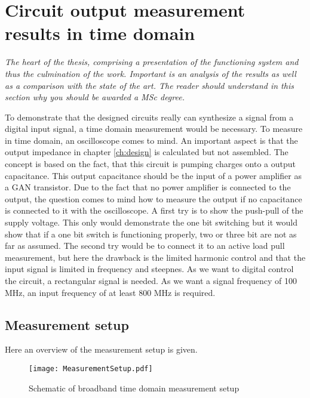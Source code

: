 \chapter{Circuit output measurement results in time domain}
\textit{The heart of the thesis, comprising a presentation of the functioning system and thus the culmination of the work. Important is an analysis of the results as well as a comparison with the state of the art. The reader should understand in this section why you should be awarded a MSc degree.}

To demonstrate that the designed circuits really can synthesize a signal from a digital input signal, a time domain measurement would be necessary.
To measure in time domain, an oscilloscope comes to mind.
An important aspect is that the output impedance in chapter \ref{ch:design} is calculated but not assembled. 
The concept is based on the fact, that this circuit is pumping charges onto a output capacitance.
This output capacitance should be the input of a power amplifier as a GAN transistor.
Due to the fact that no power amplifier is connected to the output, the question comes to mind how to measure the output if no capacitance is connected to it with the oscilloscope.
A first try is to show the push-pull of the supply voltage. 
This only would demonstrate the one bit switching but it would show that if a one bit switch is functioning properly, two or three bit are not as far as assumed.
The second try would be to connect it to an active load pull measurement, but here the drawback is the limited harmonic control and that the input signal is limited in frequency and steepnes. 
As we want to digital control the circuit, a rectangular signal is needed.
As we want a signal frequency of 100 MHz, an input frequency of at least 800 MHz is required.\\

\section{Measurement setup}
Here an overview of the measurement setup is given. 


\begin{figure}[htb!]
	\centering
  \texttt{[image: MeasurementSetup.pdf]}
	\caption{Schematic of broadband time domain measurement setup}
	\label{fig:SchematicMeasSetup}
\end{figure}



